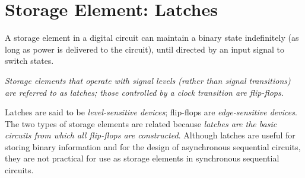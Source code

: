 \section{Storage Element: Latches}
\label{sec:stor-ele-latch}

A storage element in a digital circuit can maintain a binary state indefinitely (as long as power is delivered to the circuit), until directed by an input signal to switch states.

\textit{Storage elements that operate with signal levels (rather than signal transitions) are referred to as latches; those controlled by a clock transition are flip-flops}.

Latches are said to be \textit{level-sensitive devices}; flip-flops are \textit{edge-sensitive devices}. The two types of storage elements are related because \textit{latches are the basic circuits from which all flip-flops are constructed}. Although latches are useful for storing binary information and for the design of asynchronous sequential circuits, they are not practical for use as storage elements in synchronous sequential circuits.




